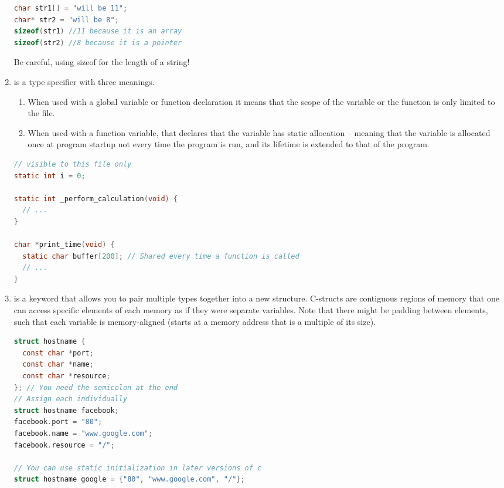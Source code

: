 \begin{enumerate}
	      \begin{lstlisting}[language=C]
char str1[] = "will be 11";
char* str2 = "will be 8";
sizeof(str1) //11 because it is an array
sizeof(str2) //8 because it is a pointer
\end{lstlisting}

	      Be careful, using sizeof for the length of a string!

	\item {} is a type specifier with three meanings.

	      \begin{enumerate}
		      \item When used with a global variable or function declaration it means that the scope of the variable or the function is only limited to the file.
		      \item When used with a function variable, that declares that the variable has static allocation -- meaning that the variable is allocated once at program startup not every time the program is run, and its lifetime is extended to that of the program.
	      \end{enumerate}

	      \begin{lstlisting}[language=C]
// visible to this file only
static int i = 0;

static int _perform_calculation(void) {
  // ...
}

char *print_time(void) {
  static char buffer[200]; // Shared every time a function is called
  // ...
}
\end{lstlisting}

	    \item {} is a keyword that allows you to pair multiple types together into a new structure.
        C-structs are contiguous regions of memory that one can access specific elements of each memory as if they were separate variables.
        Note that there might be padding between elements, such that each variable is memory-aligned (starts at a memory address that is a multiple of its size).

	      \begin{lstlisting}[language=C]
struct hostname {
  const char *port;
  const char *name;
  const char *resource;
}; // You need the semicolon at the end
// Assign each individually
struct hostname facebook;
facebook.port = "80";
facebook.name = "www.google.com";
facebook.resource = "/";

// You can use static initialization in later versions of c
struct hostname google = {"80", "www.google.com", "/"};
\end{lstlisting}



\end{enumerate}
